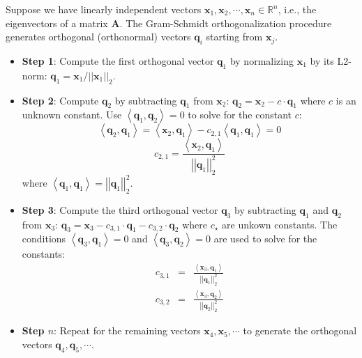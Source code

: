 \documentclass{article}[11pt]
\newcommand{\norm}[1]{\left|\left|#1\right|\right|}
\begin{document}
\begin{mdframed}
Suppose we have linearly independent vectors $\mathbf{x}_{1}, \mathbf{x}_{2}, \cdots, \mathbf{x}_{n}\in\mathbb{R}^{n}$, i.e., the eigenvectors of a matrix $\mathbf{A}$.
The Gram-Schmidt orthogonalization procedure generates orthogonal (orthonormal) vectors $\mathbf{q}_{i}$ starting from $\mathbf{x}_{j}$.
\begin{itemize}[leftmargin=16pt]
   \item{\textbf{Step 1}: Compute the first orthogonal vector $\mathbf{q}_{1}$ by normalizing $\mathbf{x}_{1}$ by its L2-norm:  $\mathbf{q}_{1} =  \mathbf{x}_{1}/\norm{\mathbf{x}_{1}}_{2}$.}
   \item{\textbf{Step 2}: Compute $\mathbf{q}_{2}$ by subtracting $\mathbf{q}_{1}$ from $\mathbf{x}_{2}$: $\mathbf{q}_{2} = \mathbf{x}_{2} - c\cdot\mathbf{q}_{1}$
      where $c$ is an unknown constant. Use $\left<\mathbf{q}_{1},\mathbf{q}_{2}\right> = 0$ to solve for the constant $c$:
      \begin{equation*}
         \left<\mathbf{q}_{2},\mathbf{q}_{1}\right> = \left<\mathbf{x}_{2},\mathbf{q}_{1}\right> - c_{2,1}\left<\mathbf{q}_{1},\mathbf{q}_{1}\right> = 0
      \end{equation*}
      \begin{equation*}
         c_{2,1} = \frac{\left<\mathbf{x}_{2},\mathbf{q}_{1}\right>}{\norm{\mathbf{q}_{1}}_{2}^{2}}
      \end{equation*}
      where $\left<\mathbf{q}_{1},\mathbf{q}_{1}\right> = \norm{\mathbf{q}_{1}}_{2}^{2}$.}
   \item{\textbf{Step 3}: Compute the third orthogonal vector $\mathbf{q}_{3}$ by subtracting $\mathbf{q}_{1}$ and $\mathbf{q}_{2}$ from $\mathbf{x}_{3}$: $\mathbf{q}_{3} = \mathbf{x}_{3} - c_{3,1}\cdot\mathbf{q}_{1} - c_{3,2}\cdot\mathbf{q}_{2}$
      where $c_{\star}$ are unkown constants. The conditions $\left<\mathbf{q}_{3},\mathbf{q}_{1}\right> = 0$
      and $\left<\mathbf{q}_{3},\mathbf{q}_{2}\right> = 0$ are used to solve for the constants:
      \begin{eqnarray*}
         c_{3,1} & = & \frac{\left<\mathbf{x}_{3},\mathbf{q}_{1}\right>}{\norm{\mathbf{q}_{1}}_{2}^{2}} \\
         c_{3,2} & = &  \frac{\left<\mathbf{x}_{3},\mathbf{q}_{2}\right>}{\norm{\mathbf{q}_{2}}_{2}^{2}}
      \end{eqnarray*}}
   \item{\textbf{Step $n$}: Repeat for the remaining vectors $\mathbf{x}_{4},\mathbf{x}_{5},\cdots$ to generate the orthogonal vectors $\mathbf{q}_{4},\mathbf{q}_{5},\cdots$.
}
\end{itemize}
\end{mdframed}
\end{document}
